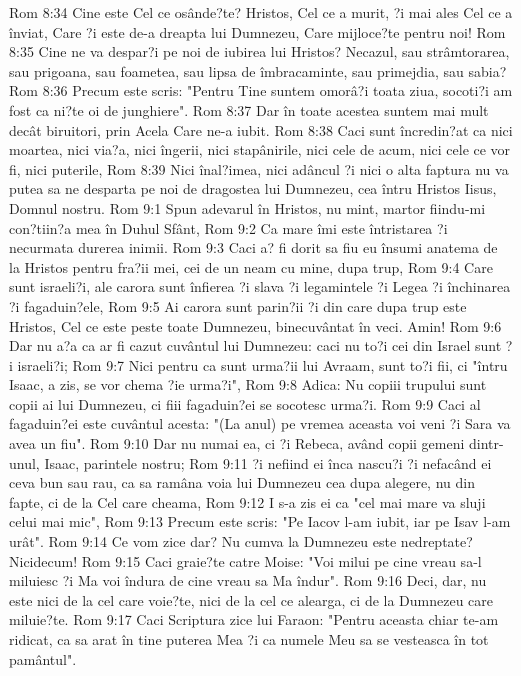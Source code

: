Rom 8:34  Cine este Cel ce osânde?te? Hristos, Cel ce a murit, ?i mai ales Cel ce a înviat, Care ?i este de-a dreapta lui Dumnezeu, Care mijloce?te pentru noi!
Rom 8:35  Cine ne va despar?i pe noi de iubirea lui Hristos? Necazul, sau strâmtorarea, sau prigoana, sau foametea, sau lipsa de îmbracaminte, sau primejdia, sau sabia?
Rom 8:36  Precum este scris: "Pentru Tine suntem omorâ?i toata ziua, socoti?i am fost ca ni?te oi de junghiere".
Rom 8:37  Dar în toate acestea suntem mai mult decât biruitori, prin Acela Care ne-a iubit.
Rom 8:38  Caci sunt încredin?at ca nici moartea, nici via?a, nici îngerii, nici stapânirile, nici cele de acum, nici cele ce vor fi, nici puterile,
Rom 8:39  Nici înal?imea, nici adâncul ?i nici o alta faptura nu va putea sa ne desparta pe noi de dragostea lui Dumnezeu, cea întru Hristos Iisus, Domnul nostru.
Rom 9:1  Spun adevarul în Hristos, nu mint, martor fiindu-mi con?tiin?a mea în Duhul Sfânt,
Rom 9:2  Ca mare îmi este întristarea ?i necurmata durerea inimii.
Rom 9:3  Caci a? fi dorit sa fiu eu însumi anatema de la Hristos pentru fra?ii mei, cei de un neam cu mine, dupa trup,
Rom 9:4  Care sunt israeli?i, ale carora sunt înfierea ?i slava ?i legamintele ?i Legea ?i închinarea ?i fagaduin?ele,
Rom 9:5  Ai carora sunt parin?ii ?i din care dupa trup este Hristos, Cel ce este peste toate Dumnezeu, binecuvântat în veci. Amin!
Rom 9:6  Dar nu a?a ca ar fi cazut cuvântul lui Dumnezeu: caci nu to?i cei din Israel sunt ?i israeli?i;
Rom 9:7  Nici pentru ca sunt urma?ii lui Avraam, sunt to?i fii, ci "întru Isaac, a zis, se vor chema ?ie urma?i",
Rom 9:8  Adica: Nu copiii trupului sunt copii ai lui Dumnezeu, ci fiii fagaduin?ei se socotesc urma?i.
Rom 9:9  Caci al fagaduin?ei este cuvântul acesta: "(La anul) pe vremea aceasta voi veni ?i Sara va avea un fiu".
Rom 9:10  Dar nu numai ea, ci ?i Rebeca, având copii gemeni dintr-unul, Isaac, parintele nostru;
Rom 9:11  ?i nefiind ei înca nascu?i ?i nefacând ei ceva bun sau rau, ca sa ramâna voia lui Dumnezeu cea dupa alegere, nu din fapte, ci de la Cel care cheama,
Rom 9:12  I s-a zis ei ca "cel mai mare va sluji celui mai mic",
Rom 9:13  Precum este scris: "Pe Iacov l-am iubit, iar pe Isav l-am urât".
Rom 9:14  Ce vom zice dar? Nu cumva la Dumnezeu este nedreptate? Nicidecum!
Rom 9:15  Caci graie?te catre Moise: "Voi milui pe cine vreau sa-l miluiesc ?i Ma voi îndura de cine vreau sa Ma îndur".
Rom 9:16  Deci, dar, nu este nici de la cel care voie?te, nici de la cel ce alearga, ci de la Dumnezeu care miluie?te.
Rom 9:17  Caci Scriptura zice lui Faraon: "Pentru aceasta chiar te-am ridicat, ca sa arat în tine puterea Mea ?i ca numele Meu sa se vesteasca în tot pamântul".
